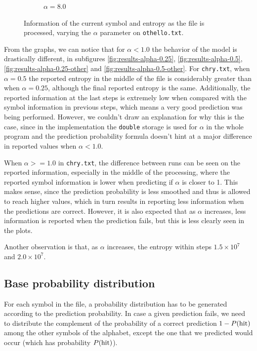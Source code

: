\documentclass{article}
\begin{document}
\begin{figure}
\begin{subfigure}[b]{0.3\textwidth}
\begin{center}
        \end{center}
        \caption{$\alpha = 8.0$}
        \label{fig:results-alpha-other-8.0}
    \end{subfigure}
    \caption{Information of the current symbol and entropy as the file is processed, varying the $\alpha$ parameter on \verb|othello.txt|.}
    \label{fig:results-alpha-other}
\end{figure}

From the graphs, we can notice that for $\alpha < 1.0$ the behavior of the model is drastically different, in subfigures \ref{fig:results-alpha-0.25}, \ref{fig:results-alpha-0.5}, \ref{fig:results-alpha-0.25-other} and \ref{fig:results-alpha-0.5-other}.
For \verb|chry.txt|, when $\alpha = 0.5$ the reported entropy in the middle of the file is considerably greater than when $\alpha = 0.25$, although the final reported entropy is the same.
Additionally, the reported information at the last steps is extremely low when compared with the symbol information in previous steps, which means a very good prediction was being performed.
However, we couldn't draw an explanation for why this is the case, since in the implementation the \verb|double| storage is used for $\alpha$ in the whole program and the prediction probability formula doesn't hint at a major difference in reported values when $\alpha < 1.0$.

When $\alpha >= 1.0$ in \verb|chry.txt|, the difference between runs can be seen on the reported information, especially in the middle of the processing, where the reported symbol information is lower when predicting if $\alpha$ is closer to 1.
This makes sense, since the prediction probability is less smoothed and thus is allowed to reach higher values, which in turn results in reporting less information when the predictions are correct.
However, it is also expected that as $\alpha$ increases, less information is reported when the prediction fails, but this is less clearly seen in the plots.

Another observation is that, as $\alpha$ increases, the entropy within steps $1.5\times10^7$ and $2.0\times10^7$.

\subsection{Base probability distribution}

For each symbol in the file, a probability distribution has to be generated according to the prediction probability.
In case a given prediction fails, we need to distribute the complement of the probability of a correct prediction $1 - P(\textnormal{hit})$ among the other symbols of the alphabet, except the one that we predicted would occur (which has probability $P(\textnormal{hit})$).
\end{document}
